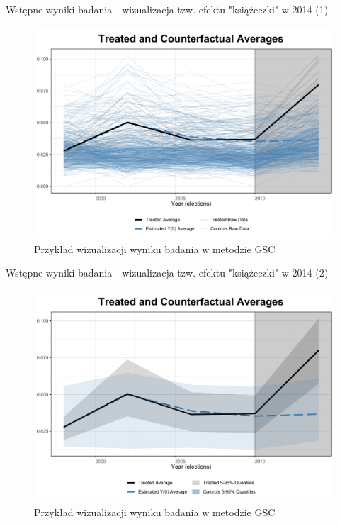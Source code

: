 \documentclass[12pt]{beamer}
\begin{document}
\begin{frame}{Wstępne wyniki badania - wizualizacja tzw. efektu "książeczki" w 2014 (1)}
    
\begin{figure}
\includegraphics[scale=0.43]{ife_no_pred_2_factors_sample_0_2_raw.pdf}
\caption{\label{fig:did}Przykład wizualizacji wyniku badania w metodzie GSC}
\end{figure}
    
\end{frame}

\begin{frame}{Wstępne wyniki badania - wizualizacja tzw. efektu "książeczki" w 2014 (2)}
    
\begin{figure}
\includegraphics[scale=0.43]{ife_no_pred_2_factors_sample_0_2_band}
\caption{\label{fig:did}Przykład wizualizacji wyniku badania w metodzie GSC}
\end{figure}
    
\end{frame}
\end{document}

